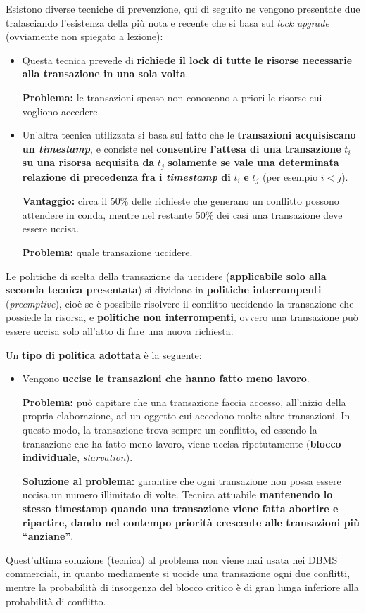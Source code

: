 \documentclass[a4paper]{article}
\newcommand{\dquotes}[1]{``#1''}
\begin{document}
	Esistono diverse tecniche di prevenzione, qui di seguito ne vengono presentate due tralasciando l'esistenza della più nota e recente che si basa sul \emph{lock upgrade} (ovviamente non spiegato a lezione):
	\begin{itemize}
		\item Questa tecnica prevede di \textbf{richiede il lock di tutte le risorse necessarie alla transazione in una sola volta}.
		
		\textcolor{Red3}{\textbf{Problema:}} le transazioni spesso non conoscono a priori le risorse cui vogliono accedere.
		
		
		\item Un'altra tecnica utilizzata si basa sul fatto che le \textbf{transazioni acquisiscano un \emph{timestamp}}, e consiste nel \textbf{consentire l'attesa di una transazione} $t_{i}$ \textbf{su una risorsa acquisita da} $t_{j}$ \textbf{solamente se vale una determinata relazione di precedenza fra i \emph{timestamp} di} $t_{i}$ \textbf{e} $t_{j}$ (per esempio $i < j$).
	
		\textcolor{Green4}{\textbf{Vantaggio:}} circa il 50\% delle richieste che generano un conflitto possono attendere in conda, mentre nel restante 50\% dei casi una transazione deve essere uccisa.
		
		\textcolor{Red3}{\textbf{Problema:}} quale transazione uccidere.
	\end{itemize}
	Le politiche di scelta della transazione da uccidere (\textbf{applicabile solo alla seconda tecnica presentata}) si dividono in \textbf{politiche interrompenti} (\emph{preemptive}), cioè se è possibile risolvere il conflitto uccidendo la transazione che possiede la risorsa, e \textbf{politiche non interrompenti}, ovvero una transazione può essere uccisa solo all'atto di fare una nuova richiesta.\newline
	
	\noindent
	Un \textbf{tipo di politica adottata} è la seguente:
	\begin{itemize}
		\item Vengono \textbf{uccise le transazioni che hanno fatto meno lavoro}.
		
		\textcolor{Red3}{\textbf{Problema:}} può capitare che una transazione faccia accesso, all'inizio della propria elaborazione, ad un oggetto cui accedono molte altre transazioni. In questo modo, la transazione trova sempre un conflitto, ed essendo la transazione che ha fatto meno lavoro, viene uccisa ripetutamente (\textbf{blocco individuale}, \emph{starvation}).
		
		\textcolor{Green4}{\textbf{Soluzione al problema:}} garantire che ogni transazione non possa essere uccisa un numero illimitato di volte. Tecnica attuabile \textbf{mantenendo lo stesso timestamp quando una transazione viene fatta abortire e ripartire, dando nel contempo priorità crescente alle transazioni più \dquotes{anziane}}.
	\end{itemize}
	Quest'ultima soluzione (tecnica) al problema non viene mai usata nei DBMS commerciali, in quanto mediamente si uccide una transazione ogni due conflitti, mentre la probabilità di insorgenza del blocco critico è di gran lunga inferiore alla probabilità di conflitto.\newpage
	
\end{document}
